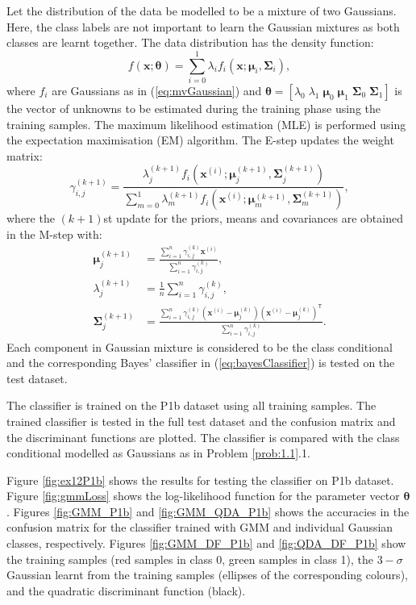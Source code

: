 \documentclass[11pt, a4 paper]{article}
\newcommand{\bx}{\mathbf{x}}
\newcommand{\TT}{\mathsf{T}}
\newcommand{\bmu}{\boldsymbol{\mu}}
\newcommand{\btheta}{\boldsymbol{\theta}}
\newcommand{\bSigma}{\boldsymbol{\Sigma}}
\begin{document}
\label{prob:1.2}
Let the distribution of the data be modelled to be a mixture of two Gaussians. Here, the class labels are not important to learn the Gaussian mixtures as both classes are learnt together. The data distribution has the density function:
\begin{equation}
	f(\bx; \btheta) = \sum_{i=0}^{1} \lambda_{i} f_{i}(\bx; \bmu_{i}, \bSigma_{i}),
\label{eq:gmmModel}
\end{equation}
where $f_{i}$ are Gaussians as in (\ref{eq:mvGaussian}) and $\btheta = [\lambda_{0} \; \lambda_{1} \; \bmu_{0} \; \bmu_{1} \; \bSigma_{0} \; \bSigma_{1}]$ is the vector of unknowns to be estimated during the training phase using the training samples. The maximum likelihood estimation (MLE) is performed using the expectation maximisation (EM) algorithm. The E-step updates the weight matrix:
\begin{equation}
	\gamma_{i,j}^{(k+1)} = \frac{\lambda_{j}^{(k+1)} f_{i}(\bx^{(i)}; \bmu_{j}^{(k+1)}, \bSigma_{j}^{{(k+1)}})}{\sum_{m=0}^{1} \lambda_{m}^{(k+1)} f_{i}(\bx^{(i)}; \bmu_{m}^{(k+1)}, \bSigma_{m}^{(k+1)})},
\label{eq:estep}
\end{equation}
where the $(k+1)$st update for the priors, means and covariances are obtained in the M-step with:
\begin{equation}
\begin{split}
	\bmu_{j}^{(k+1)} &= \frac{\sum_{i=1}^{n} \gamma^{(k)}_{i,j} \bx^{(i)}}{\sum_{i=1}^{n} \gamma^{(k)}_{i,j}}, \\
	\lambda_{j}^{(k+1)} &= \frac{1}{n} \sum_{i=1}^{n} \gamma^{(k)}_{i,j}, \\
	\bSigma_{j}^{(k+1)} &= \frac{\sum_{i=1}^{n} \gamma^{(k)}_{i,j} (\bx^{(i)} - \bmu_{j}^{(k)})(\bx^{(i)} - \bmu_{j}^{(k)})^{\TT}}{\sum_{i=1}^{n} \gamma^{(k)}_{i,j}}.
\end{split}
\label{eq:mstep}
\end{equation}
Each component in Gaussian mixture is considered to be the class conditional and the corresponding Bayes' classifier in (\ref{eq:bayesClassifier}) is tested on the test dataset.

The classifier is trained on the P1b dataset using all training samples. The trained classifier is tested in the full test dataset and the confusion matrix and the discriminant functions are plotted. The classifier is compared with the class conditional modelled as Gaussians as in Problem \ref{prob:1.1}.1.

Figure \ref{fig:ex12P1b} shows the results for testing the classifier on P1b dataset. Figure \ref{fig:gmmLoss} shows the log-likelihood function for the parameter vector $\btheta$. Figures \ref{fig:GMM_P1b} and \ref{fig:GMM_QDA_P1b} shows the accuracies in the confusion matrix for the classifier trained with GMM and individual Gaussian classes, respectively. Figures \ref{fig:GMM_DF_P1b} and \ref{fig:QDA_DF_P1b} show the training samples (red samples in class 0, green samples in class 1), the $3-\sigma$ Gaussian learnt from the training samples (ellipses of the corresponding colours), and the quadratic discriminant function (black).
\end{document}
